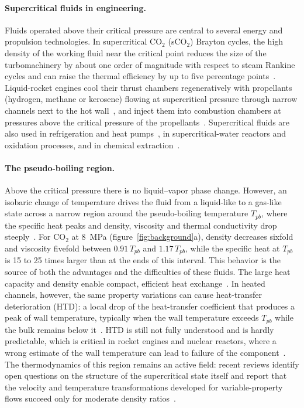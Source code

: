\documentclass[11pt]{article}
\begin{document}
\paragraph{Supercritical fluids in engineering.} Fluids operated above their critical
pressure are central to several energy and propulsion technologies. In supercritical
CO$_2$ (sCO$_2$) Brayton cycles, the high density of the working fluid near the critical
point reduces the size of the turbomachinery by about one order of magnitude with respect
to steam Rankine cycles and can raise the thermal efficiency by up to five percentage
points~\cite{Ahn2015}. Liquid-rocket engines cool their thrust chambers regeneratively with
propellants (hydrogen, methane or kerosene) flowing at supercritical pressure through
narrow channels next to the hot wall~\cite{Pizzarelli2018,Nasuti2021}, and inject them into
combustion chambers at pressures above the critical pressure of the
propellants~\cite{JofreUrzay2021,Bellan2020}. Supercritical fluids are also used in
refrigeration and heat pumps~\cite{Nieuwenhuyse2023}, in supercritical-water reactors and
oxidation processes, and in chemical extraction~\cite{Brunner2010,Yoo2013}.

\paragraph{The pseudo-boiling region.} Above the critical pressure there is no
liquid--vapor phase change. However, an isobaric change of temperature drives the fluid
from a liquid-like to a gas-like state across a narrow region around the pseudo-boiling
temperature $T_{pb}$, where the specific heat peaks and density, viscosity and thermal
conductivity drop steeply~\cite{Banuti2015}. For CO$_2$ at 8~MPa
(figure~\ref{fig:background}a), density decreases sixfold and viscosity fivefold between
$0.91\,T_{pb}$ and $1.17\,T_{pb}$, while the specific heat at $T_{pb}$ is 15 to 25 times
larger than at the ends of this interval. This behavior is the source of both the
advantages and the difficulties of these fluids. The large heat capacity and density
enable compact, efficient heat exchange~\cite{Ahn2015}. In heated channels, however, the
same property variations can cause heat-transfer deterioration (HTD): a local drop of the
heat-transfer coefficient that produces a peak of wall temperature, typically when the wall
temperature exceeds $T_{pb}$ while the bulk remains below it~\cite{Urbano2013}. HTD is still
not fully understood and is hardly predictable, which is critical in rocket engines and
nuclear reactors, where a wrong estimate of the wall temperature can lead to failure of the
component~\cite{Pizzarelli2018}. The thermodynamics of this region remains an active field:
recent reviews identify open questions on the structure of the supercritical state itself
and report that the velocity and temperature transformations developed for variable-property
flows succeed only for moderate density ratios~\cite{Li2025}.
\end{document}
